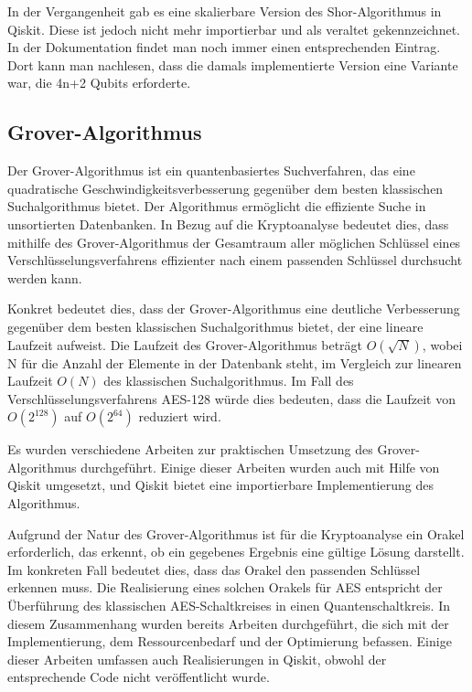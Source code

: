 \documentclass[
	a4paper, %
	10pt, %
	unnumberedsections, %
	twoside, %
]{LTJournalArticle}
\begin{document}
In der Vergangenheit gab es eine skalierbare Version des Shor-Algorithmus in Qiskit. Diese ist jedoch nicht mehr importierbar und als veraltet gekennzeichnet. In der Dokumentation findet man noch immer einen entsprechenden Eintrag. Dort kann man nachlesen, dass die damals implementierte Version eine Variante war, die 4n+2 Qubits erforderte\autocite{IBM:Shor_docu}.

\subsection{Grover-Algorithmus}
Der Grover-Algorithmus ist ein quantenbasiertes Suchverfahren, das eine quadratische Geschwindigkeitsverbesserung gegenüber dem besten klassischen Suchalgorithmus bietet\autocite{grover1996fast}. Der Algorithmus ermöglicht die effiziente Suche in unsortierten Datenbanken. In Bezug auf die Kryptoanalyse bedeutet dies, dass mithilfe des Grover-Algorithmus der Gesamtraum aller möglichen Schlüssel eines Verschlüsselungsverfahrens effizienter nach einem passenden Schlüssel durchsucht werden kann.

Konkret bedeutet dies, dass der Grover-Algorithmus eine deutliche Verbesserung gegenüber dem besten klassischen Suchalgorithmus bietet, der eine lineare Laufzeit aufweist. Die Laufzeit des Grover-Algorithmus beträgt $O(\sqrt N)$, wobei N für die Anzahl der Elemente in der Datenbank steht, im Vergleich zur linearen Laufzeit $O(N)$ des klassischen Suchalgorithmus. Im Fall des Verschlüsselungsverfahrens AES-128 würde dies bedeuten,  dass die Laufzeit von $O(2^{128})$ auf $O(2^{64})$ reduziert wird.

Es wurden verschiedene Arbeiten zur praktischen Umsetzung des Grover-Algorithmus durchgeführt. Einige dieser Arbeiten wurden auch mit Hilfe von Qiskit umgesetzt, und Qiskit bietet eine importierbare Implementierung des Algorithmus\autocite{IBM:Grover}.

Aufgrund der Natur des Grover-Algorithmus ist für die Kryptoanalyse ein Orakel erforderlich, das erkennt, ob ein gegebenes Ergebnis eine gültige Lösung darstellt. Im konkreten Fall bedeutet dies, dass das Orakel den passenden Schlüssel erkennen muss. Die Realisierung eines solchen Orakels für AES entspricht der Überführung des klassischen AES-Schaltkreises in einen Quantenschaltkreis. In diesem Zusammenhang wurden bereits Arbeiten durchgeführt, die sich mit der Implementierung\autocite{jaques2019implementing}, dem Ressourcenbedarf \autocite{grassl2015applying} und der Optimierung\autocite{Li2022} befassen.  Einige dieser Arbeiten umfassen auch Realisierungen in Qiskit, obwohl der entsprechende Code nicht veröffentlicht wurde\autocite{app11199085}.
\end{document}
